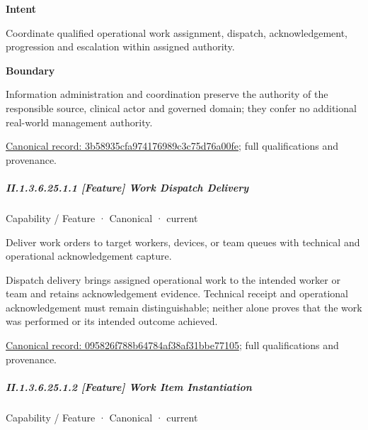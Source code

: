\textbf{Intent}



Coordinate qualified operational work assignment, dispatch, acknowledgement, progression and escalation within assigned authority.



\textbf{Boundary}



Information administration and coordination preserve the authority of the responsible source, clinical actor and governed domain; they confer no additional real-world management authority.


{\footnotesize \href{../../../../../../../continuum/strategy/capability/3b58935cfa974176989c3c75d76a00fe.md}{Canonical record: 3b58935cfa974176989c3c75d76a00fe}; full qualifications and provenance.}\par
\subparagraph*{II.1.3.6.25.1.1 [Feature] Work Dispatch Delivery}
\label{navigation:II.1.3.6.25.1.1}

\label{element:095826f788b64784af38af31bbe77105}
{\small Capability / Feature · Canonical · current}\par

Deliver work orders to target workers, devices, or team queues with technical and operational acknowledgement capture.



Dispatch delivery brings assigned operational work to the intended worker or team and retains acknowledgement evidence. Technical receipt and operational acknowledgement must remain distinguishable; neither alone proves that the work was performed or its intended outcome achieved.


{\footnotesize \href{../../../../../../../continuum/strategy/capability/feature/095826f788b64784af38af31bbe77105.md}{Canonical record: 095826f788b64784af38af31bbe77105}; full qualifications and provenance.}\par
\subparagraph*{II.1.3.6.25.1.2 [Feature] Work Item Instantiation}
\label{navigation:II.1.3.6.25.1.2}

\label{element:321fa656c71f4019842b5b991dbc9ff4}
{\small Capability / Feature · Canonical · current}\par

